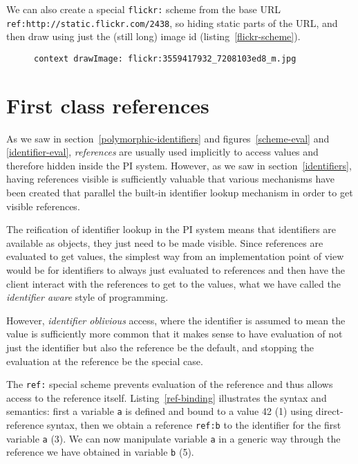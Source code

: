 \documentclass[preprint,authoryear]{llncs}
\begin{document}
We can also create a special {\tt flickr:} scheme from the base URL {\tt ref:http://static.flickr.com/2438},
so hiding static parts of the URL,
and then draw using just the (still long) image id (listing~\ref{flickr-scheme}).

\begin{figure}[htbp]
\begin{lstlisting}[style=L,label=flickr-scheme,caption=Drawing remote image via {\tt flickr:}]
context drawImage: flickr:3559417932_7208103ed8_m.jpg
\end{lstlisting}
\end{figure}


\section{First class references}
\label{references}


As we saw in section~\ref{polymorphic-identifiers} and figures~\ref{scheme-eval} and \ref{identifier-eval}, \emph{references}
are usually used implicitly to access values and therefore hidden inside the PI system.  However,
as we saw in section~\ref{identifiers}, having references visible is sufficiently valuable that various
mechanisms have been created that parallel the built-in identifier lookup mechanism in order to
get visible references.

The reification of identifier lookup in the PI system means that identifiers are available as objects, 
they just need to be made visible.   Since references are evaluated to get values, the 
simplest way from an implementation point of view would be for identifiers to always just
evaluated to references and then have the client interact with the references to get to
the values, what we have called the \emph{identifier aware} style of programming.

However, \emph{identifier oblivious} access, where the identifier is assumed to mean the
value is sufficiently more common that it makes sense to have evaluation of not just
the identifier but also the reference be the default, and stopping the evaluation at the
reference be the special case.

The {\tt ref:} special scheme prevents evaluation of the reference and thus allows access
to the reference itself.  Listing~\ref{ref-binding} illustrates the syntax and semantics:
first a variable {\tt a} is defined and bound to a value 42 (1) using direct-reference syntax,
then we obtain a reference {\tt ref:b} to
the identifier for the first variable {\tt a} (3).  We can now manipulate variable {\tt a} 
in a generic way through the reference we have obtained in variable {\tt b} (5).  
\end{document}
